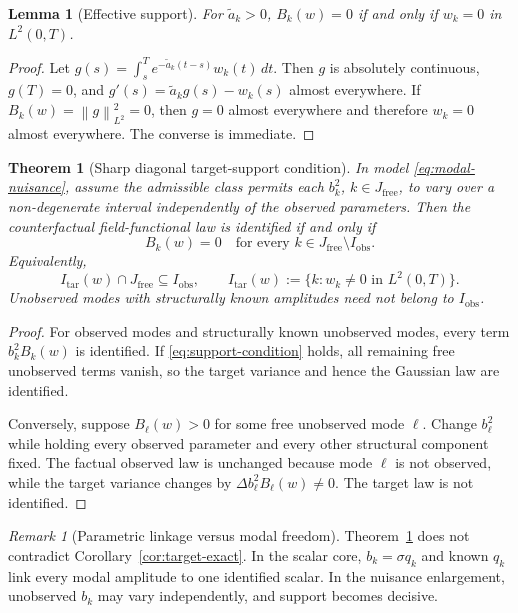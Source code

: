 \documentclass[11pt]{article}
\newtheorem{theorem}[assumption]{Theorem}
\newtheorem{lemma}[assumption]{Lemma}
\theoremstyle{remark}
\newtheorem{remark}[assumption]{Remark}
\newcommand{\norm}[1]{\left\lVert #1\right\rVert}
\newcommand{\obs}{\mathrm{obs}}
\newcommand{\tar}{\mathrm{tar}}
\newcommand{\1}{\mathbf 1}
\begin{document}
\begin{lemma}[Effective support]\label{lem:effective-support}
For $\widetilde a_k>0$, $B_k(w)=0$ if and only if $w_k=0$ in $L^2(0,T)$.
\end{lemma}

\begin{proof}
Let
$g(s)=\int_s^T e^{-\widetilde a_k(t-s)}w_k(t)\,dt$.
Then $g$ is absolutely continuous, $g(T)=0$, and
$g'(s)=\widetilde a_kg(s)-w_k(s)$ almost everywhere.  If $B_k(w)=\norm{g}_{L^2}^2=0$, then $g=0$ almost everywhere and therefore $w_k=0$ almost everywhere.  The converse is immediate.
\end{proof}

\begin{theorem}[Sharp diagonal target-support condition]\label{thm:support}
In model \eqref{eq:modal-nuisance}, assume the admissible class permits each $b_k^2$, $k\in J_{\mathrm{free}}$, to vary over a non-degenerate interval independently of the observed parameters.  Then the counterfactual field-functional law is identified if and only if
\begin{equation}\label{eq:support-condition}
 B_k(w)=0
 \quad\text{for every }k\in J_{\mathrm{free}}\setminus I_{\obs}.
\end{equation}
Equivalently,
\[
 I_{\tar}(w)\cap J_{\mathrm{free}}
 \subseteq I_{\obs},
 \qquad
 I_{\tar}(w):=\{k:w_k\ne0\text{ in }L^2(0,T)\}.
\]
Unobserved modes with structurally known amplitudes need not belong to $I_{\obs}$.
\end{theorem}

\begin{proof}
For observed modes and structurally known unobserved modes, every term $b_k^2B_k(w)$ is identified.  If \eqref{eq:support-condition} holds, all remaining free unobserved terms vanish, so the target variance and hence the Gaussian law are identified.

Conversely, suppose $B_\ell(w)>0$ for some free unobserved mode $\ell$.  Change $b_\ell^2$ while holding every observed parameter and every other structural component fixed.  The factual observed law is unchanged because mode $\ell$ is not observed, while the target variance changes by
$\Delta b_\ell^2B_\ell(w)\ne0$.  The target law is not identified.
\end{proof}

\begin{remark}[Parametric linkage versus modal freedom]
Theorem~\ref{thm:support} does not contradict Corollary~\ref{cor:target-exact}.  In the scalar core, $b_k=\sigma q_k$ and known $q_k$ link every modal amplitude to one identified scalar.  In the nuisance enlargement, unobserved $b_k$ may vary independently, and support becomes decisive.
\end{remark}
\end{document}
